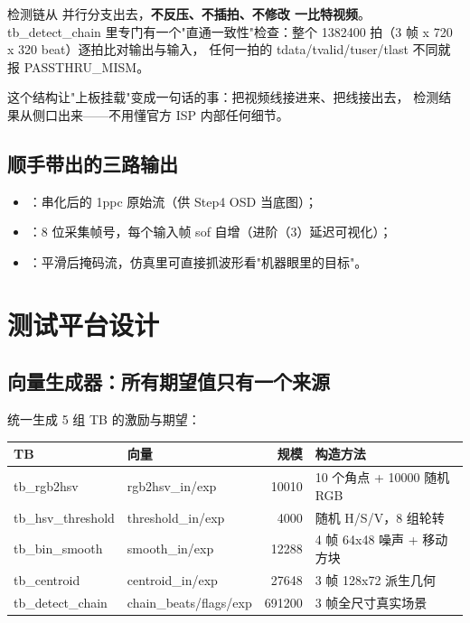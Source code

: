检测链从  并行分支出去，\textbf{不反压、不插拍、不修改
一比特视频}。tb\_detect\_chain 里专门有一个"直通一致性"检查：整个
1382400 拍（3 帧 x 720 x 320 beat）逐拍比对输出与输入，
任何一拍的 tdata/tvalid/tuser/tlast 不同就报 PASSTHRU\_MISM。

这个结构让"上板挂载"变成一句话的事：把视频线接进来、把线接出去，
检测结果从侧口出来——不用懂官方 ISP 内部任何细节。

\subsection{顺手带出的三路输出}

\begin{itemize}
  \item {}：串化后的 1ppc 原始流（供 Step4 OSD 当底图）；
  \item {}：8 位采集帧号，每个输入帧 sof 自增（进阶（3）延迟可视化）；
  \item {}：平滑后掩码流，仿真里可直接抓波形看"机器眼里的目标"。
\end{itemize}

\section{测试平台设计}

\subsection{向量生成器：所有期望值只有一个来源}

 统一生成 5 组 TB 的激励与期望：

\begin{center}
\begin{tabular}{llrl}
\toprule
\rowcolor{rowtint}\textbf{TB} & \textbf{向量} & \textbf{规模} & \textbf{构造方法} \\
\midrule
tb\_rgb2hsv & rgb2hsv\_in/exp & 10010 & 10 个角点 + 10000 随机 RGB \\
tb\_hsv\_threshold & threshold\_in/exp & 4000 & 随机 H/S/V，8 组轮转 \\
tb\_bin\_smooth & smooth\_in/exp & 12288 & 4 帧 64x48 噪声 + 移动方块 \\
tb\_centroid & centroid\_in/exp & 27648 & 3 帧 128x72 派生几何 \\
tb\_detect\_chain & chain\_beats/flags/exp & 691200 & 3 帧全尺寸真实场景 \\
\bottomrule
\end{tabular}
\end{center}

